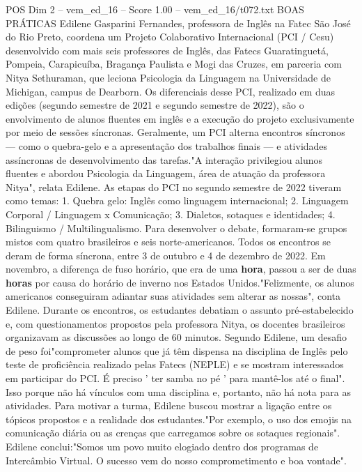 \begin{textsample}{POS Dim 2 – vem\_ed\_16 – Score 1.00 – vem\_ed\_16/t072.txt}  \label{ex:f2_pos_019}
BOAS PRÁTICAS Edilene Gasparini Fernandes, professora de Inglês na Fatec São José do Rio Preto, coordena um Projeto Colaborativo Internacional (PCI / Cesu) desenvolvido com mais seis professores de Inglês, das Fatecs Guaratinguetá, Pompeia, Carapicuíba, Bragança Paulista e Mogi das Cruzes, em parceria com Nitya Sethuraman, que leciona Psicologia da Linguagem na Universidade de Michigan, campus de Dearborn.
Os diferenciais desse PCI, realizado em duas edições (segundo semestre de 2021 e segundo semestre de 2022), são o envolvimento de alunos fluentes em inglês e a execução do projeto exclusivamente por meio de sessões síncronas.
Geralmente, um PCI alterna encontros síncronos — como o quebra-gelo e a apresentação dos trabalhos finais — e atividades assíncronas de desenvolvimento das tarefas."A interação privilegiou alunos fluentes e abordou Psicologia da Linguagem, área de atuação da professora Nitya", relata Edilene.
As etapas do PCI no segundo semestre de 2022 tiveram como temas: 1.
Quebra gelo: Inglês como linguagem internacional; 2.
Linguagem Corporal / Linguagem x Comunicação; 3.
Dialetos, sotaques e identidades; 4.
Bilinguismo / Multilingualismo.
Para desenvolver o debate, formaram-se grupos mistos com quatro brasileiros e seis norte-americanos.
Todos os encontros se deram de forma síncrona, entre 3 de outubro e 4 de dezembro de 2022.
Em novembro, a diferença de fuso horário, que era de uma \textbf{hora}, passou a ser de duas \textbf{horas} por causa do horário de inverno nos Estados Unidos."Felizmente, os alunos americanos conseguiram adiantar suas atividades sem alterar as nossas", conta Edilene.
Durante os encontros, os estudantes debatiam o assunto pré-estabelecido e, com questionamentos propostos pela professora Nitya, os docentes brasileiros organizavam as discussões ao longo de 60 minutos.
Segundo Edilene, um desafio de peso foi"comprometer alunos que já têm dispensa na disciplina de Inglês pelo teste de proficiência realizado pelas Fatecs (NEPLE) e se mostram interessados em participar do PCI.
É preciso ' ter samba no pé ' para mantê-los até o final".
Isso porque não há vínculos com uma disciplina e, portanto, não há nota para as atividades.
Para motivar a turma, Edilene buscou mostrar a ligação entre os tópicos propostos e a realidade dos estudantes."Por exemplo, o uso dos emojis na comunicação diária ou as crenças que carregamos sobre os sotaques regionais".
Edilene conclui:"Somos um povo muito elogiado dentro dos programas de Intercâmbio Virtual.
O sucesso vem do nosso comprometimento e boa vontade".

\end{textsample}
